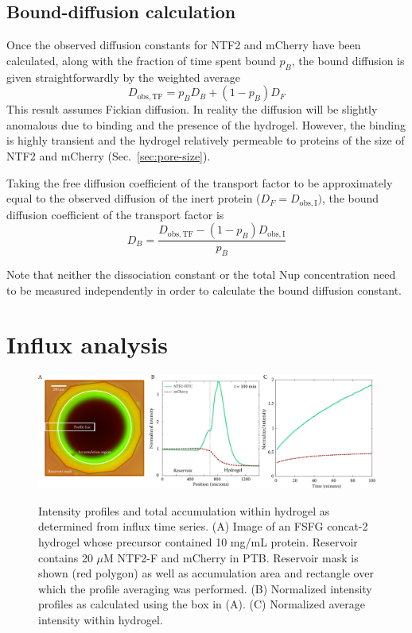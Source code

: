 \subsection{Bound-diffusion calculation}
\label{sec:db-calc}

Once the observed diffusion constants for NTF2 and mCherry have been calculated, along with the fraction of time spent bound $p_B$, the bound diffusion is given straightforwardly by the weighted average
\begin{equation}
D_\mathrm{obs, TF} = p_B D_B + (1-p_B) D_F
\label{eq:weighted-average}
\end{equation}
This result assumes Fickian diffusion.  In reality the diffusion will be slightly anomalous due to binding and the presence of the hydrogel.  However, the binding is highly transient and the hydrogel relatively permeable to proteins of the size of NTF2 and mCherry (Sec.~\ref{sec:pore-size}).

Taking the free diffusion coefficient of the transport factor to be approximately equal to the observed diffusion of the inert protein ($D_F = D_\mathrm{obs,I})$, the bound diffusion coefficient of the transport factor is
\begin{equation}
D_B = \frac{D_\mathrm{obs, TF}-(1-p_B) D_\mathrm{obs,I}}{p_B}
\label{eq:d-bound}
\end{equation}

Note that neither the dissociation constant or the total Nup concentration need to be measured independently in order to calculate the bound diffusion constant.

\section{Influx analysis}
\label{sec:influx-analysis}

\begin{figure}
\caption[Intensity profiles and accumulation curve from influx experiments.]{Intensity profiles and total accumulation within hydrogel as determined from influx time series.  (A) Image of an FSFG concat-2 hydrogel whose precursor contained 10 mg/mL protein. Reservoir contains 20 $\mu$M NTF2-F and mCherry in PTB. Reservoir mask is shown (red polygon) as well as accumulation area and rectangle over which the profile averaging was performed. (B) Normalized intensity profiles as calculated using the box in (A).  (C) Normalized average intensity within hydrogel.}
\centering
\includegraphics[width=\textwidth]{figs/ch04/influx-plots.pdf}
\label{fig:influx-plots}
\end{figure}

